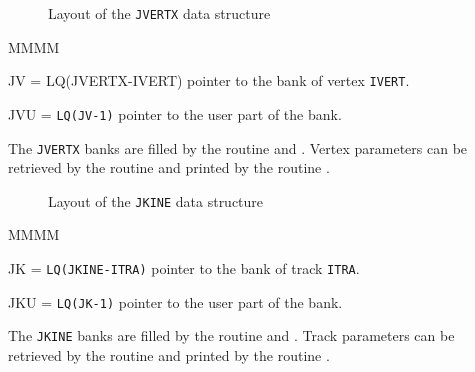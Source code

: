       

\begin{figure}[hbt]
     \centering
     \caption{Layout of the {\tt JVERTX} data structure}
     \label{fg:kine199-1}
\end{figure}

\begin{DLtt}{MMMM}
\item[JV]= LQ(JVERTX-IVERT) pointer to the bank of vertex {\tt IVERT}.
\item[JVU]= {\tt LQ(JV-1)} pointer to the user part of the bank.
\end{DLtt}

The {\tt JVERTX} banks are filled by the routine  and .
Vertex parameters can be retrieved by the routine  and printed
by the routine .
 
\clearpage

\begin{figure}[hbt]
     \centering
     \caption{Layout of the {\tt JKINE} data structure}
     \label{fg:kine199-2}
\end{figure}

 
\begin{DLtt}{MMMM}
\item[JK]= {\tt LQ(JKINE-ITRA)} pointer to the bank of track {\tt ITRA}.
\item[JKU]= {\tt LQ(JK-1)} pointer to the user part of the bank.
\end{DLtt}
 
The {\tt JKINE} banks are filled by the routine  and .
Track parameters can be retrieved by the routine  and printed
by the routine .
